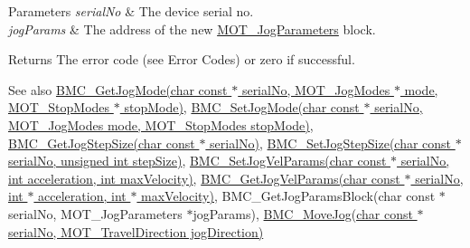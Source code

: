 \begin{DoxyParams}{Parameters}
{\em serial\+No} & The device serial no. \\
\hline
{\em jog\+Params} & The address of the new \hyperlink{struct_m_o_t___jog_parameters}{M\+O\+T\+\_\+\+Jog\+Parameters} block. \\
\hline
\end{DoxyParams}
\begin{DoxyReturn}{Returns}
The error code (see Error Codes) or zero if successful. 
\end{DoxyReturn}
\begin{DoxySeeAlso}{See also}
\hyperlink{group___t_cube_brushless_motor_gafc92fe606b9cd874d7f28d7791e8a06e}{B\+M\+C\+\_\+\+Get\+Jog\+Mode(char const $\ast$ serial\+No, M\+O\+T\+\_\+\+Jog\+Modes $\ast$ mode, M\+O\+T\+\_\+\+Stop\+Modes $\ast$ stop\+Mode)}, \hyperlink{group___t_cube_brushless_motor_ga5cc6ed2932a1761531546d41a9240136}{B\+M\+C\+\_\+\+Set\+Jog\+Mode(char const $\ast$ serial\+No, M\+O\+T\+\_\+\+Jog\+Modes mode, M\+O\+T\+\_\+\+Stop\+Modes stop\+Mode)}, \hyperlink{group___t_cube_brushless_motor_ga2a2db2c5c7f24bbff73f17af4e10bdd1}{B\+M\+C\+\_\+\+Get\+Jog\+Step\+Size(char const $\ast$ serial\+No)}, \hyperlink{group___t_cube_brushless_motor_gaeff03c620c9c2a0719c58dc9d97ed8c3}{B\+M\+C\+\_\+\+Set\+Jog\+Step\+Size(char const $\ast$ serial\+No, unsigned int step\+Size)}, \hyperlink{group___t_cube_brushless_motor_ga5344f441c200c330ef267401054c307e}{B\+M\+C\+\_\+\+Set\+Jog\+Vel\+Params(char const $\ast$ serial\+No, int acceleration, int max\+Velocity)}, \hyperlink{group___t_cube_brushless_motor_ga096d9f530ba9e298f7c687a891b6182f}{B\+M\+C\+\_\+\+Get\+Jog\+Vel\+Params(char const $\ast$ serial\+No, int $\ast$ acceleration, int $\ast$ max\+Velocity)}, B\+M\+C\+\_\+\+Get\+Jog\+Params\+Block(char const $\ast$ serial\+No, M\+O\+T\+\_\+\+Jog\+Parameters $\ast$jog\+Params), \hyperlink{group___t_cube_brushless_motor_gae7854ca7daacf191f792adff135f1dcd}{B\+M\+C\+\_\+\+Move\+Jog(char const $\ast$ serial\+No, M\+O\+T\+\_\+\+Travel\+Direction jog\+Direction)}


\end{DoxySeeAlso}

\begin{DoxyCodeInclude}
\end{DoxyCodeInclude}
